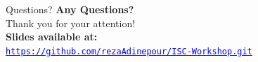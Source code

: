 \documentclass{beamer}
\begin{document}
	
	
	
	
	
	\begin{frame}{Questions?}
		\centering
		\Huge \textbf{Any Questions?} \\[0.8cm]
		
		\Large Thank you for your attention! \\[0.6cm]
		
		\normalsize
		\textbf{Slides available at:} \\
		\texttt{\href{https://github.com/rezaAdinepour/ISC-Workshop.git}{\textcolor{blue}{https://github.com/rezaAdinepour/ISC-Workshop.git}}}
	\end{frame}
	
	
	
	
\end{document}
